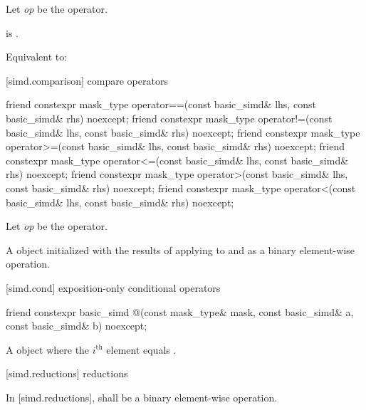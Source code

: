 \begin{itemdescr}
  \pnum Let \textit{op} be the operator.

  \pnum\constraints
   is .

  \pnum\effects
  Equivalent to: 
\end{itemdescr}

[simd.comparison]{ compare operators}

\begin{itemdecl}
friend constexpr mask_type operator==(const basic_simd& lhs, const basic_simd& rhs) noexcept;
friend constexpr mask_type operator!=(const basic_simd& lhs, const basic_simd& rhs) noexcept;
friend constexpr mask_type operator>=(const basic_simd& lhs, const basic_simd& rhs) noexcept;
friend constexpr mask_type operator<=(const basic_simd& lhs, const basic_simd& rhs) noexcept;
friend constexpr mask_type operator>(const basic_simd& lhs, const basic_simd& rhs) noexcept;
friend constexpr mask_type operator<(const basic_simd& lhs, const basic_simd& rhs) noexcept;
\end{itemdecl}

\begin{itemdescr}
  \pnum Let \textit{op} be the operator.

  \pnum\ConstraintOperatorTWellFormed

  \pnum\returns
  A  object initialized with the results of applying \op{} to  and
   as a binary element-wise operation.
\end{itemdescr}

[simd.cond]{ exposition-only conditional operators}

\begin{itemdecl}
friend constexpr basic_simd
@\simdselect@(const mask_type& mask, const basic_simd& a, const basic_simd& b) noexcept;
\end{itemdecl}

\begin{itemdescr}
  \pnum\returns
  A  object where the $i^\text{th}$ element equals  \foralli.
\end{itemdescr}

[simd.reductions]{ reductions}

\pnum
In [simd.reductions],  shall be a binary element-wise operation.

